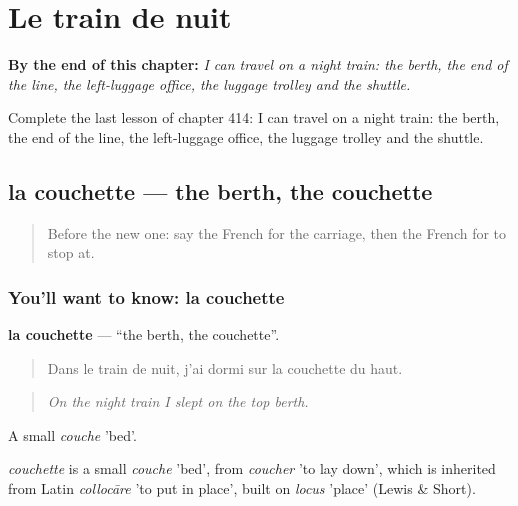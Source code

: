 
\chapter{Le train de nuit}
\label{ch:fr-le-train-de-nuit}

\begin{chapteropening}
\textbf{By the end of this chapter:} \emph{I can travel on a night train: the berth, the end of the line, the left-luggage office, the luggage trolley and the shuttle.}

Complete the last lesson of chapter 414: I can travel on a night train: the berth, the end of the line, the left-luggage office, the luggage trolley and the shuttle.
\end{chapteropening}

\section[la couchette]{la couchette — the berth, the couchette}

\label{lesson:FR-C414-couchette}



\begin{quote}
Before the new one: say the French for the carriage, then the French for to stop at.
\end{quote}

\subsection*{You'll want to know: la couchette}
\textbf{la couchette} — \textquotedblleft{}the berth, the couchette\textquotedblright{}.

\begin{quote}
Dans le train de nuit, j'ai dormi sur la couchette du haut.
\end{quote}

\begin{quote}
\emph{On the night train I slept on the top berth.}
\end{quote}

A small \emph{couche} 'bed'.

\begin{cousinweb}
\emph{couchette} is a small \emph{couche} 'bed', from \emph{coucher} 'to lay down', which is inherited from Latin \emph{collocāre} 'to put in place', built on \emph{locus} 'place' (Lewis \& Short).
\end{cousinweb}

